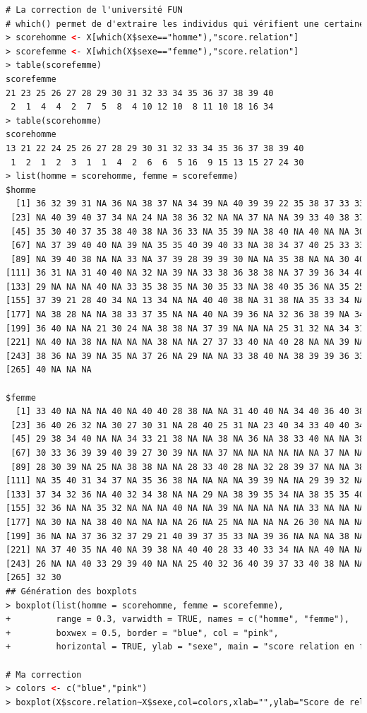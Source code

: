 \begin{lstlisting}[language=html]
# La correction de l'université FUN
# which() permet de d'extraire les individus qui vérifient une certaine condition
> scorehomme <- X[which(X$sexe=="homme"),"score.relation"]
> scorefemme <- X[which(X$sexe=="femme"),"score.relation"]
> table(scorefemme)
scorefemme
21 23 25 26 27 28 29 30 31 32 33 34 35 36 37 38 39 40 
 2  1  4  4  2  7  5  8  4 10 12 10  8 11 10 18 16 34 
> table(scorehomme)
scorehomme
13 21 22 24 25 26 27 28 29 30 31 32 33 34 35 36 37 38 39 40 
 1  2  1  2  3  1  1  4  2  6  6  5 16  9 15 13 15 27 24 30 
> list(homme = scorehomme, femme = scorefemme)
$homme
  [1] 36 32 39 31 NA 36 NA 38 37 NA 34 39 NA 40 39 39 22 35 38 37 33 33
 [23] NA 40 39 40 37 34 NA 24 NA 38 36 32 NA NA 37 NA NA 39 33 40 38 37
 [45] 35 30 40 37 35 38 40 38 NA 36 33 NA 35 39 NA 38 40 NA 40 NA NA 30
 [67] NA 37 39 40 40 NA 39 NA 35 35 40 39 40 33 NA 38 34 37 40 25 33 33
 [89] NA 39 40 38 NA NA 33 NA 37 39 28 39 39 30 NA NA 35 38 NA NA 30 40
[111] 36 31 NA 31 40 40 NA 32 NA 39 NA 33 38 36 38 38 NA 37 39 36 34 40
[133] 29 NA NA NA 40 NA 33 35 38 35 NA 30 35 33 NA 38 40 35 36 NA 35 25
[155] 37 39 21 28 40 34 NA 13 34 NA NA 40 40 38 NA 31 38 NA 35 33 34 NA
[177] NA 38 28 NA NA 38 33 37 35 NA NA 40 NA 39 36 NA 32 36 38 39 NA 34
[199] 36 40 NA NA 21 30 24 NA 38 38 NA 37 39 NA NA NA 25 31 32 NA 34 31
[221] NA 40 NA 38 NA NA NA NA 38 NA NA 27 37 33 40 NA 40 28 NA NA 39 NA
[243] 38 36 NA 39 NA 35 NA 37 26 NA 29 NA NA 33 38 40 NA 38 39 39 36 33
[265] 40 NA NA NA

$femme
  [1] 33 40 NA NA NA 40 NA 40 40 28 38 NA NA 31 40 40 NA 34 40 36 40 38
 [23] 36 40 26 32 NA 30 27 30 31 NA 28 40 25 31 NA 23 40 34 33 40 40 34
 [45] 29 38 34 40 NA NA 34 33 21 38 NA NA 38 NA 36 NA 38 33 40 NA NA 38
 [67] 30 33 36 39 39 40 39 27 30 39 NA NA 37 NA NA NA NA NA NA 37 NA NA
 [89] 28 30 39 NA 25 NA 38 38 NA NA 28 33 40 28 NA 32 28 39 37 NA NA 38
[111] NA 35 40 31 34 37 NA 35 36 38 NA NA NA NA 39 39 NA NA 29 39 32 NA
[133] 37 34 32 36 NA 40 32 34 38 NA NA 29 NA 38 39 35 34 NA 38 35 35 40
[155] 32 36 NA NA 35 32 NA NA NA 40 NA NA 39 NA NA NA NA NA 33 NA NA NA
[177] NA 30 NA NA 38 40 NA NA NA NA 26 NA 25 NA NA NA NA 26 30 NA NA NA
[199] 36 NA NA 37 36 32 37 29 21 40 39 37 35 33 NA 39 36 NA NA NA 38 NA
[221] NA 37 40 35 NA 40 NA 39 38 NA 40 40 28 33 40 33 34 NA NA 40 NA NA
[243] 26 NA NA 40 33 29 39 40 NA NA 25 40 32 36 40 39 37 33 40 38 NA NA
[265] 32 30
## Génération des boxplots
> boxplot(list(homme = scorehomme, femme = scorefemme),
+         range = 0.3, varwidth = TRUE, names = c("homme", "femme"),
+         boxwex = 0.5, border = "blue", col = "pink",
+         horizontal = TRUE, ylab = "sexe", main = "score relation en fonction du sexe")

# Ma correction
> colors <- c("blue","pink")
> boxplot(X$score.relation~X$sexe,col=colors,xlab="",ylab="Score de relation", main ="Distribution du score de relation en fonction du sexe.")
\end{lstlisting}


